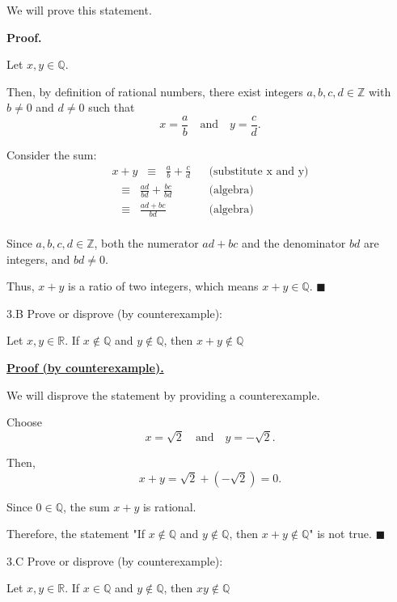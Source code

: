 \documentclass[]{article}
\begin{document}
We will prove this statement.

\medbreak

\textbf{Proof.}  

Let \(x, y \in \mathbb{Q}\).  

Then, by definition of rational numbers, there exist integers \(a, b, c, d \in \mathbb{Z}\) with \(b \neq 0\) and \(d \neq 0\) such that  
\[
x = \frac{a}{b} \quad \text{and} \quad y = \frac{c}{d}.
\]

Consider the sum:
\begin{align*} 
    x + y 
    \;\;\equiv\;\; \frac{a}{b} + \frac{c}{d} 
    && \text{(substitute x and y)} \\[6pt] 
    \;\;\equiv\;\; \frac{ad}{bd} + \frac{bc}{bd} 
    && \text{(algebra)} \\[6pt] 
    \;\;\equiv\;\; \frac{ad + bc}{bd} 
    && \text{(algebra)} \\[6pt] 
\end{align*}

Since \(a, b, c, d \in \mathbb{Z}\), both the numerator \(ad + bc\) and the denominator \(bd\) are integers, and \(bd \neq 0\).  

Thus, \(x+y\) is a ratio of two integers, which means \(x+y \in \mathbb{Q}\). \(\blacksquare\)

\begin{question}{3.B}
    Prove or disprove (by counterexample):
        \begin{center}
            Let $x, y \in \mathbb{R}$. If $x \notin \mathbb{Q}$ and $y \notin \mathbb{Q}$, then $x+y \notin \mathbb{Q}$
        \end{center}
\end{question}

\underline{\textbf{Proof (by counterexample).}}  

We will disprove the statement by providing a counterexample.  

Choose 
\[
x = \sqrt{2} \quad \text{and} \quad y = -\sqrt{2}.
\]

Then, 
\[
x + y = \sqrt{2} + (-\sqrt{2}) = 0.
\]

Since \(0 \in \mathbb{Q}\), the sum \(x+y\) is rational.  

Therefore, the statement "If \(x \notin \mathbb{Q}\) and \(y \notin \mathbb{Q}\), then \(x+y \notin \mathbb{Q}\)" is not true. \(\blacksquare\)

\begin{question}{3.C}
    Prove or disprove (by counterexample):
        \begin{center}
            Let $x, y \in \mathbb{R}$. If $x \in \mathbb{Q}$ and $y \notin \mathbb{Q}$, then $xy \notin \mathbb{Q}$
        \end{center}
\end{question}
\end{document}
